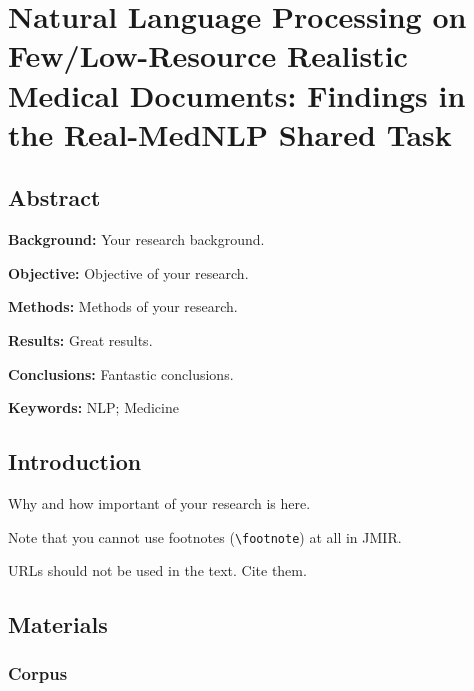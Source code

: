 \documentclass[12pt]{article}
\begin{document}



\section{Natural Language Processing on Few/Low-Resource Realistic Medical Documents: Findings in the Real-MedNLP Shared Task}

\subsection{Abstract}
\textbf{Background:} 
Your research background.

\textbf{Objective:} 
Objective of your research.

\textbf{Methods:} 
Methods of your research.

\textbf{Results:} 
Great results.

\textbf{Conclusions:} 
Fantastic conclusions.

\textbf{Keywords:}
NLP;
Medicine

\subsection{Introduction}  %

Why and how important of your research is here. 

Note that you cannot use footnotes (\verb|\footnote|) at all in JMIR.

URLs should not be used in the text. Cite them.

\subsection{Materials}  %


\subsubsection{Corpus}  %
\end{document}
